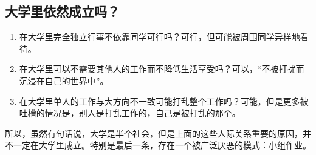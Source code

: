     \subsection{大学里依然成立吗？}\label{subsec:Uncategorized/IsUniversityInterpersonImportant/IsItInUniversity}
        \begin{enumerate}
            \item 在大学里完全独立行事不依靠同学可行吗？可行，但可能被周围同学异样地看待。
            \item 在大学里可以不需要其他人的工作而不降低生活享受吗？可以，“不被打扰而沉浸在自己的世界中”。
            \item 在大学里单人的工作与大方向不一致可能打乱整个工作吗？可能，但是更多被吐槽的情况是，别人是打乱工作的，自己是被打乱的那个。
        \end{enumerate}
        所以，虽然有句话说，大学是半个社会，但是上面的这些人际关系重要的原因，并不一定在大学里成立。特别是最后一条，存在一个被广泛厌恶的模式：小组作业。
